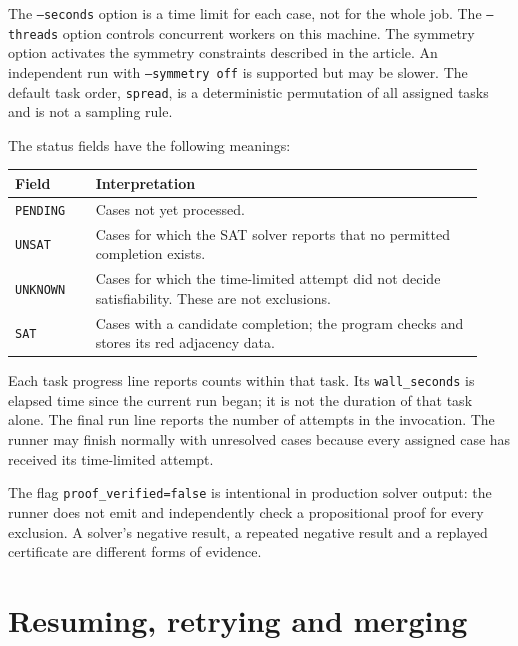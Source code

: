 \documentclass[11pt]{article}
\begin{document}
The \texttt{--seconds} option is a time limit for each case, not for
the whole job. The \texttt{--threads} option controls concurrent
workers on this machine. The symmetry option activates the symmetry
constraints described in the article. An independent run with
\texttt{--symmetry off} is supported but may be slower. The default
task order, \texttt{spread}, is a deterministic permutation of all
assigned tasks and is not a sampling rule.

\begin{minipage}{\linewidth}
The status fields have the following meanings:
\begin{center}
\begin{tabular}{@{}p{0.16\linewidth}p{0.77\linewidth}@{}}
\toprule
Field & Interpretation \\
\midrule
\texttt{PENDING} & Cases not yet processed. \\
\texttt{UNSAT} & Cases for which the SAT solver reports that no
permitted completion exists. \\
\texttt{UNKNOWN} & Cases for which the time-limited attempt did not
decide satisfiability. These are not exclusions. \\
\texttt{SAT} & Cases with a candidate completion; the program checks
and stores its red adjacency data. \\
\bottomrule
\end{tabular}
\end{center}

\end{minipage}

Each task progress line reports counts within that task. Its
\texttt{wall\_seconds} is elapsed time since the current run began;
it is not the duration of that task alone. The final run line reports
the number of attempts in the invocation. The runner may finish
normally with unresolved cases because every assigned case has received
its time-limited attempt.

The flag \texttt{proof\_verified=false} is intentional in production
solver output: the runner does not emit and independently check a
propositional proof for every exclusion. A solver's negative result,
a repeated negative result and a replayed certificate are different
forms of evidence.

\section{Resuming, retrying and merging}
\label{sec:resume}
\end{document}
